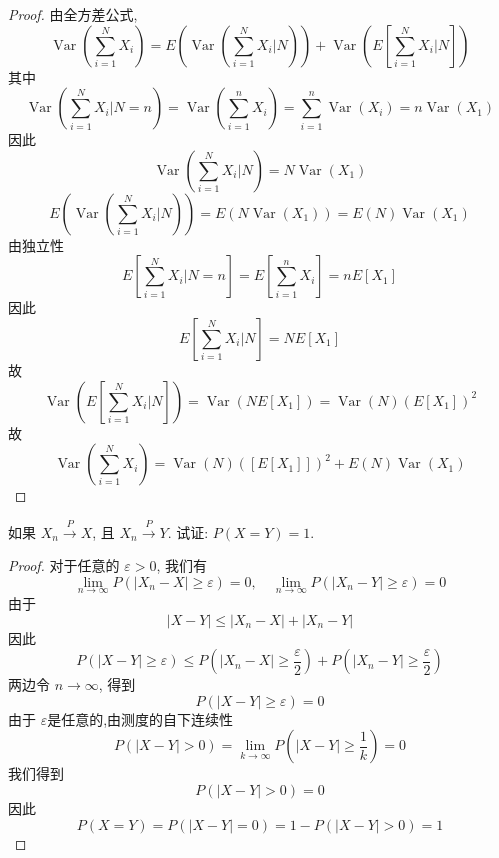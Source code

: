 \documentclass[../main.tex]{subfiles}
\begin{document}
\begin{proof}
    由全方差公式, \[
    \operatorname{Var}\left( \sum _{i= 1}^{N}X_{i} \right)= E\left( \operatorname{Var}\left( \sum _{i= 1}^{N}X_{i}|N \right)  \right)+ \operatorname{Var}\left( E\left[ \sum _{i= 1}^{N}X_{i}|N \right]  \right)   
    \]其中 \[
    \operatorname{Var}\left( \sum _{i= 1}^{N}X_{i}|N= n \right)= \operatorname{Var}\left( \sum _{i= 1}^{n}X_{i} \right)= \sum _{i= 1}^{n}\operatorname{Var}\left( X_{i} \right)   = n \operatorname{Var}\left( X_1 \right) 
    \]因此  \[
    \operatorname{Var}\left( \sum _{i= 1}^{N}X_{i}|N \right)= N \operatorname{Var}\left( X_1 \right) 
    \]\[
    E\left( \operatorname{Var}\left( \sum _{i= 1}^{N}X_{i}|N \right)  \right)=  E\left( N \operatorname{Var}\left( X_1 \right)  \right)=E\left( N \right)  \operatorname{Var}\left( X_1 \right)  
    \]由独立性 \[
    E\left[ \sum _{i= 1}^{N}X_{i}|N= n \right]= E\left[ \sum _{i= 1}^{n}X_{i} \right]=   nE[X_{1}]
    \]因此 \[
    E[\sum _{i= 1}^{N}X_{i}|N]= NE[X_{1}]
    \]故 \[
    \operatorname{Var}\left( E\left[ \sum _{i= 1}^{N}X_{i}|N \right]  \right)= \operatorname{Var}\left( NE[X_{1}] \right)  = \operatorname{Var}\left( N \right) \left( E[X_{1}] \right)^{2}  
    \]故 \[
    \operatorname{Var}\left( \sum _{i= 1}^{N}X_{i} \right)= \operatorname{Var}\left( N \right)\left( \left[ E\left[ X_{1} \right]  \right]  \right)^{2}+ E\left( N \right)\operatorname{Var}\left( X_1 \right)     
    \]
\end{proof}

\begin{exercise}{}{}
如果 $X_n \xrightarrow{P} X$, 且 $X_n \xrightarrow{P} Y$. 试证: $P(X=Y)=1$.
\end{exercise}

\begin{proof}
    对于任意的 \(   \varepsilon > 0  \), 我们有   \[
      \lim_{n\to \infty}P\left( \left| X_{n}-X \right|\ge  \varepsilon    \right)= 0 ,\quad \lim_{n\to \infty}P\left( \left| X_{n}-Y \right|\ge  \varepsilon   \right)= 0 
      \] 由于 \[
      \left| X-Y \right|\le \left| X_{n}-X \right|+ \left| X_{n}-Y \right|   
      \]因此\[
      P\left( \left| X-Y \right|\ge  \varepsilon   \right) \le P\left( \left| X_{n}-X \right|\ge \frac{ \varepsilon  }{2 }   \right)+ P\left( \left| X_{n}-Y \right|\ge \frac{ \varepsilon  }{2 }   \right)  
      \]两边令 \(  n\to \infty  \), 得到 \[
      P\left( \left| X-Y \right|\ge  \varepsilon   \right)= 0 
      \]由于 \(   \varepsilon   \)是任意的,由测度的自下连续性 \[
      P\left( \left| X-Y \right|>  0 \right) = \lim_{k\to \infty}P\left( \left| X-Y \right|\ge \frac{1 }{k }   \right)= 0 
      \] 我们得到 \[
      P\left( \left| X-Y \right|> 0  \right)= 0 
      \]因此 \[
      P\left( X= Y \right)= P\left( \left| X-Y \right|= 0  \right)= 1-P\left( \left| X-Y \right|> 0  \right)= 1   
      \]
\end{proof}
\end{document}
